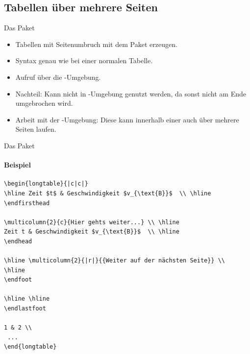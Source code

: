 \subsection{Tabellen über mehrere Seiten}
\begin{frame}[fragile]{Das Paket }
\begin{itemize}
\item Tabellen mit Seitenumbruch mit dem Paket  erzeugen.\pause
\item Syntax genau wie bei einer normalen Tabelle. \pause
\item Aufruf über die -Umgebung. \pause
\item Nachteil: Kann nicht in -Umgebung genutzt werden, da sonst nicht am Ende umgebrochen wird.\pause
\item Arbeit mit der -Umgebung: Diese kann innerhalb einer  auch über mehrere Seiten laufen. 
\end{itemize}
\end{frame}

\begin{frame}[fragile]{Das Paket }
\framesubtitle{Beispiel}
\footnotesize
\begin{codeblock}
\begin{Verbatim}[fontsize=\tiny]  
\begin{longtable}{|c|c|}
\hline Zeit $t$ & Geschwindigkeit $v_{\text{B}}$  \\ \hline 
\endfirsthead

\multicolumn{2}{c}{Hier gehts weiter...} \\ \hline 
Zeit t & Geschwindigkeit $v_{\text{B}}$  \\ \hline 
\endhead

\hline \multicolumn{2}{|r|}{{Weiter auf der nächsten Seite}} \\ 
\hline
\endfoot

\hline \hline
\endlastfoot

1 & 2 \\ 
 ...
\end{longtable}
\end{Verbatim}
\end{codeblock}
\end{frame}

